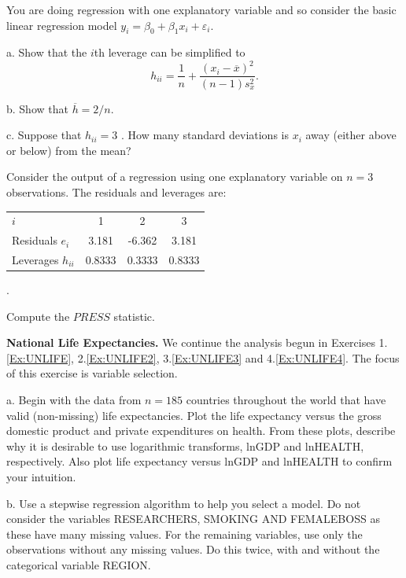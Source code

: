 \begin{exercises}


\item  You are doing regression with one explanatory variable and so
consider the basic linear regression model $y_i = \beta_0 +  \beta_1
x_i + \varepsilon_i$.

a.  Show that the $i$th leverage can be simplified to
\begin{equation*}
h_{ii} = \frac{1}{n} + \frac{(x_i - \overline{x})^2}{(n-1) s_x^2}.
\end{equation*}

b.  Show that  $\overline{h}= 2 / n$.

c.  Suppose that $h_{ii} = 3$ . How many standard deviations is
$x_i$ away (either above or below) from the mean?

\item Consider the output of a regression using one explanatory
variable on $n=3$ observations. The residuals and leverages are:
\begin{tabular}{l|ccc}
\hline
$i$ & 1 & 2 & 3 \\
Residuals $e_i$ & 3.181 & -6.362 & 3.181 \\
Leverages $h_{ii}$ & 0.8333 & 0.3333 & 0.8333\\ \hline
\end{tabular}.

Compute the $PRESS$ statistic.


\item \textbf{National Life Expectancies.}\label{Ex:UNLIFE4} We
continue the analysis begun in Exercises 1.\ref{Ex:UNLIFE},
2.\ref{Ex:UNLIFE2}, 3.\ref{Ex:UNLIFE3} and 4.\ref{Ex:UNLIFE4}. The
focus of this exercise is variable selection.

a. Begin with the data from $n=185$ countries throughout the world
that have valid (non-missing) life expectancies. Plot the life
expectancy versus the gross domestic product and private
expenditures on health. From these plots, describe why it is
desirable to use logarithmic transforms, lnGDP and lnHEALTH,
respectively. Also plot life expectancy versus lnGDP and lnHEALTH to
confirm your intuition.

b. Use a stepwise regression algorithm to help you select a model.
Do not consider the variables RESEARCHERS, SMOKING AND FEMALEBOSS as
these have many missing values. For the remaining variables, use
only the observations without any missing values. Do this twice,
with and without the categorical variable REGION.


\end{exercises}
